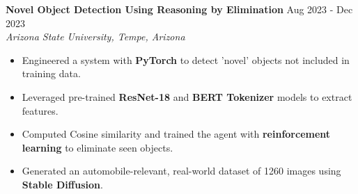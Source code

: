 \documentclass[a4paper,9pt]{extarticle}
\begin{document}
\noindent
\textbf{Novel Object Detection Using Reasoning by Elimination} \hfill Aug 2023 - Dec 2023\\%
\textit{Arizona State University, Tempe, Arizona}
\begin{itemize}
    \item Engineered a system with \textbf{PyTorch} to detect 'novel' objects not included in training data.
    \item Leveraged pre-trained \textbf{ResNet-18} and \textbf{BERT Tokenizer} models to extract features. 
    \item Computed Cosine similarity and trained the agent with \textbf{reinforcement learning} to eliminate seen objects.
    \item Generated an automobile-relevant, real-world dataset of 1260 images using \textbf{Stable Diffusion}. %
\end{itemize}


\end{document}
